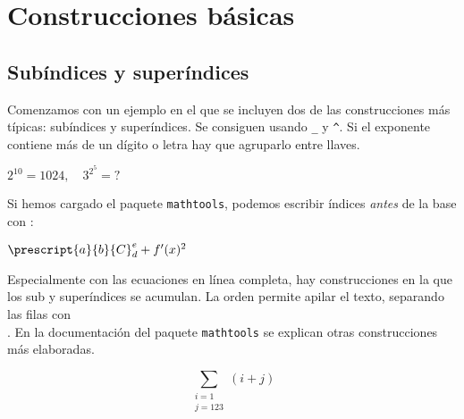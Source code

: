 \documentclass{article}
\numberwithin{equation}{section}
\theoremstyle{plain}
\theoremstyle{definition}
\theoremstyle{remark}
\begin{document}
\section{Construcciones básicas}

\subsection{Subíndices y superíndices}

Comenzamos con un ejemplo en el que se incluyen dos de las construcciones más típicas: subíndices y superíndices. Se consiguen usando \verb+_+ y \verb+^+. Si el exponente contiene más de un dígito o letra hay que agruparlo entre llaves.
\begin{codigo-lado}
$2^{10}=1024, \quad 3^{2^5}=?$
\end{codigo-lado}

Si hemos cargado el paquete \texttt{mathtools}, podemos escribir índices \emph{antes} de la base con \texttt{\prescript{}{}{}}:
\begin{codigo-lado}
$\prescript{a}{b}{C}_{d}^{e} + f'(x)^{2}$
\end{codigo-lado}

Especialmente con las ecuaciones en línea completa, hay construcciones en la que los sub y superíndices se acumulan. La orden \texttt{\substack{}} permite apilar el texto, separando las filas con \texttt{\\}. En la documentación del paquete \texttt{mathtools} se explican otras construcciones más elaboradas.
\begin{codigo-lado}
\[
\sum_{\substack{i=1\\ j=123}} (i+j)
\]
\end{codigo-lado}
\end{document}

